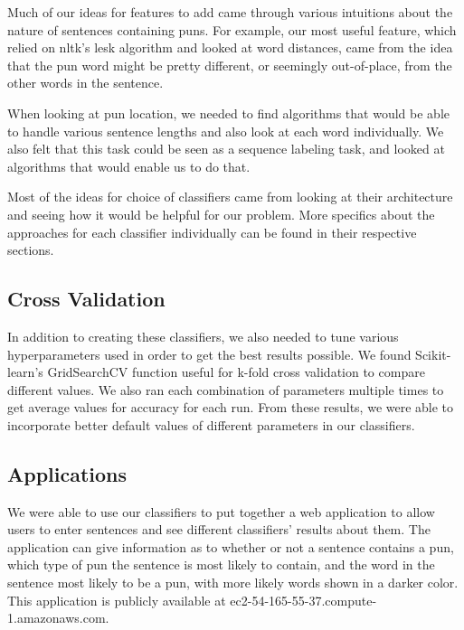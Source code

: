 \documentclass{article}
\begin{document}
Much of our ideas for features to add came through various intuitions about the nature of sentences containing puns. For example, our most useful feature, which relied on nltk's lesk algorithm and looked at word distances, came from the idea that the pun word might be pretty different, or seemingly out-of-place, from the other words in the sentence.  

When looking at pun location, we needed to find algorithms that would be able to handle various sentence lengths and also look at each word individually. We also felt that this task could be seen as a sequence labeling task, and looked at algorithms that would enable us to do that. 

Most of the ideas for choice of classifiers came from looking at their architecture and seeing how it would be helpful for our problem. More specifics about the approaches for each classifier individually can be found in their respective sections.



\subsection{Cross Validation}
In addition to creating these classifiers, we also needed to tune various hyperparameters used in order to get the best results possible. We found Scikit-learn's GridSearchCV function useful for k-fold cross validation to compare different values. We also ran each combination of parameters multiple times to get average values for accuracy for each run. From these results, we were able to incorporate better default values of different parameters in our classifiers. 

\subsection{Applications}
We were able to use our classifiers to put together a web application to allow users to enter sentences and see different classifiers' results about them. The application can give information as to whether or not a sentence contains a pun, which type of pun the sentence is most likely to contain, and the word in the sentence most likely to be a pun, with more likely words shown in a darker color. This application is publicly available at ec2-54-165-55-37.compute-1.amazonaws.com.

\end{document}
